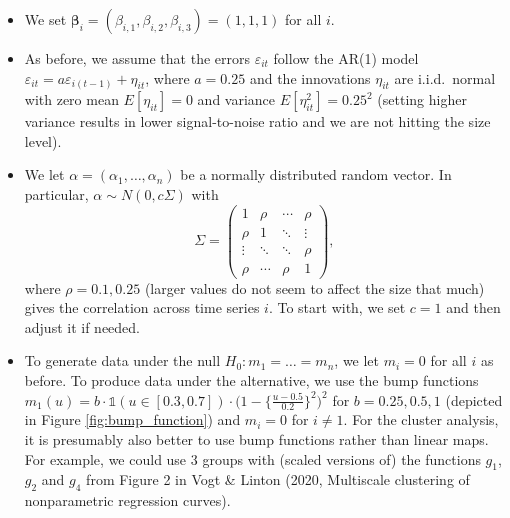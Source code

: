 \documentclass[a4paper,12pt]{article}
\begin{document}
\begin{enumerate}[label=\arabic*.,leftmargin=0.6cm]
{\begin{itemize}[topsep=0pt]
\begin{itemize}[label=--,leftmargin=0.45cm,itemsep=0pt]
\item We set $\boldsymbol{\beta}_i = (\beta_{i,1},\beta_{i,2},\beta_{i,3}) = (1,1,1)$ for all $i$.

\item As before, we assume that the errors $\varepsilon_{it}$ follow the AR(1) model $\varepsilon_{it} = a \varepsilon_{i(t-1)} + \eta_{it}$, where $a=0.25$ and the innovations $\eta_{it}$ are i.i.d.\ normal with zero mean $E[\eta_{it}]=0$ and variance $E[\eta_{it}^2]=0.25^2$ {\color{red}(setting higher variance results in lower signal-to-noise ratio and we are not hitting the size level)}. 

\item We let $\alpha = (\alpha_1,\ldots,\alpha_n)$ be a normally distributed random vector. In particular, $\alpha \sim N(0,c \Sigma)$ with
\[ \Sigma =
\begin{pmatrix}
1      & \rho   & \cdots & \rho   \\
\rho   & 1      & \ddots & \vdots \\
\vdots & \ddots & \ddots & \rho   \\
\rho   & \cdots & \rho   & 1
\end{pmatrix},
\]
where $\rho = 0.1, 0.25$ {\color{red}(larger values do not seem to affect the size that much)} gives the correlation across time series $i$. To start with, we set $c=1$ and then adjust it if needed.

\item To generate data under the null $H_0: m_1 = \ldots = m_n$, we let $m_i = 0$ for all $i$ as before. To produce data under the alternative, {\color{red}we use the bump functions $m_1(u) = b \cdot \mathbb{1}(u \in [0.3, 0.7]) \cdot \big(1 - \big\{\frac{u - 0.5}{0.2}\big\}^2\big)^2$ for $b = 0.25, 0.5, 1$ (depicted in Figure \ref{fig:bump_function}) and $m_i = 0$ for $i \neq 1$}. For the cluster analysis, it is presumably also better to use bump functions rather than linear maps. For example, we could use 3 groups with (scaled versions of) the functions $g_1$, $g_2$ and $g_4$ from Figure 2 in Vogt \& Linton (2020, Multiscale clustering of nonparametric regression curves).


\end{itemize}
\end{itemize}}
\end{enumerate}
\end{document}
